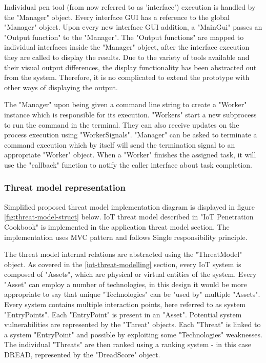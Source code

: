 Individual pen tool (from now referred to as 'interface') execution is handled by the "Manager" object. Every interface GUI has a reference to the global "Manager" object. Upon every new interface GUI addition, a "MainGui" passes an "Output function" to the "Manager". The "Output functions" are mapped to individual interfaces inside the "Manager" object, after the interface execution they are called to display the results. Due to the variety of tools available and their visual output differences, the display functionality has been abstracted out from the system. Therefore, it is no complicated to extend the prototype with other ways of displaying the output. 

The "Manager" upon being given a command line string to create a "Worker" instance which is responsible for its execution. "Workers" start a new subprocess to run the command in the terminal. They can also receive updates on the process execution using "WorkerSignals". "Manager" can be asked to terminate a command execution which by itself will send the termination signal to an appropriate "Worker" object. When a "Worker" finishes the assigned task, it will use the "callback" function to notify the caller interface about task completion.

\subsubsection{Threat model representation}
Simplified proposed threat model implementation diagram is displayed in figure \ref{fig:threat-model-struct} below.\newline
IoT threat model described in "IoT Penetration Cookbook"\cite{cookbook} is implemented in the application threat model section. The implementation uses MVC pattern and follows Single responsibility principle\cite{single-resp}. 

The threat model internal relations are abstracted using the "ThreatModel" object. As covered in the \ref{iot-threat-modelling} section, every IoT system is composed of "Assets", which are physical or virtual entities of the system. Every "Asset" can employ a number of technologies, in this design it would be more appropriate to say that unique "Technologies" can be "used by" multiple "Assets". Every system contains multiple interaction points, here referred to as system "EntryPoints". Each "EntryPoint" is present in an "Asset". Potential system vulnerabilities are represented by the "Threat" objects. Each "Threat" is linked to a system "EntryPoint" and possible by exploiting some "Technologies" weaknesses. The individual "Threats" are then ranked using a ranking system - in this case DREAD, represented by the "DreadScore" object.


